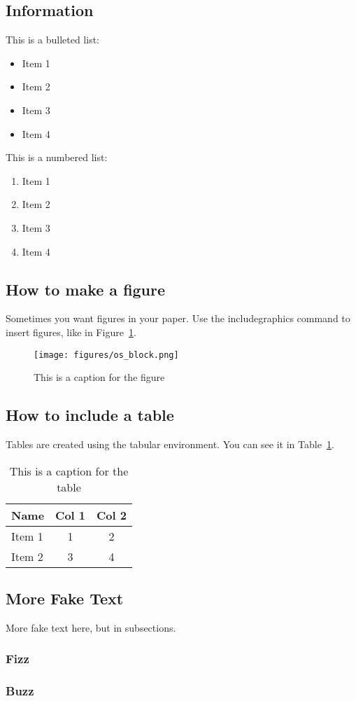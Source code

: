 \subsection{Information}

This is a bulleted list:
\begin{itemize}
\item Item 1
\item Item 2
\item Item 3
\item Item 4
\end{itemize}

This is a numbered list:
\begin{enumerate}
\item Item 1
\item Item 2
\item Item 3
\item Item 4
\end{enumerate}

\subsection{How to make a figure}
Sometimes you want figures in your paper.
Use the includegraphics command to insert figures, like in Figure~\ref{f:os_block}.

\begin{figure}
\centering %
\texttt{[image: figures/os\_block.png]}
\caption{This is a caption for the figure}
\label{f:os_block}
\end{figure}

\subsection{How to include a table}
Tables are created using the tabular environment.
You can see it in Table~\ref{t:my_table}.

\begin{table}
\centering %
\begin{tabular}{l|cc} %
Name & Col 1 & Col 2 \\ %
\hline %
Item 1 & 1 & 2 \\
Item 2 & 3 & 4\\
\end{tabular}
\caption{This is a caption for the table}
\label{t:my_table}
\end{table}

\subsection{More Fake Text}
More fake text here, but in subsections.

\subsubsection{Fizz}
\lipsum[6-8]

\subsubsection{Buzz}
\lipsum[9-10]

